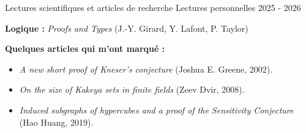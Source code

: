 \begin{cventries}
    \cventry
    {Lectures scientifiques et articles de recherche} %
    {Lectures personnelles} %
    {} %
    {2025 - 2026} %
    {
      \begin{cvitems}
        \item \textbf{Logique :} \textit{Proofs and Types} (J.-Y. Girard, Y. Lafont, P. Taylor)
        \item \textbf{Quelques articles qui m'ont marqué :}
        \begin{itemize}
            \item \textit{A new short proof of Kneser's conjecture} (Joshua E. Greene, 2002).
            \item \textit{On the size of Kakeya sets in finite fields} (Zeev Dvir, 2008).
            \item \textit{Induced subgraphs of hypercubes and a proof of the Sensitivity Conjecture} (Hao Huang, 2019).
        \end{itemize}
      \end{cvitems}
    }

\end{cventries}
